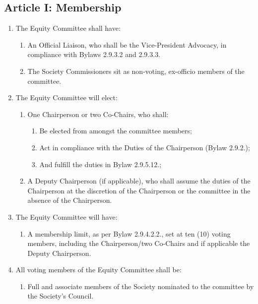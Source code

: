 \subsection{Article I: Membership}
\begin{enumerate}[label*=\arabic*., align=left]	
\item The Equity Committee shall have:
\begin{enumerate}[label*=\arabic*., align=left]	
\item An Official Liaison, who shall be the Vice-President Advocacy, in compliance with Bylaws 2.9.3.2 and 2.9.3.3.
\item The Society Commissioners sit as non-voting, ex-officio members of the committee.
\end{enumerate}
\item The Equity Committee will elect:
\begin{enumerate}[label*=\arabic*., align=left]
\item One Chairperson or two Co-Chairs, who shall:
\begin{enumerate}[label*=\arabic*., align=left]
\item Be elected from amongst the committee members;
\item Act in compliance with the Duties of the Chairperson (Bylaw 2.9.2.);
\item And fulfill the duties in Bylaw 2.9.5.12.;
\end{enumerate}
\item A Deputy Chairperson (if applicable), who shall assume the duties of the Chairperson at the discretion of the Chairperson or the committee in the absence of the Chairperson.
\end{enumerate}
\item The Equity Committee will have:
\begin{enumerate}[label*=\arabic*., align=left]
\item A membership limit, as per Bylaw 2.9.4.2.2., set at ten (10) voting members, including the Chairperson/two Co-Chairs and if applicable the Deputy Chairperson.
\end{enumerate}
\item All voting members of the Equity Committee shall be:
\begin{enumerate}[label*=\arabic*., align=left]
\item Full and associate members of the Society nominated to the committee by the Society's Council.
\end{enumerate}
\end{enumerate}

